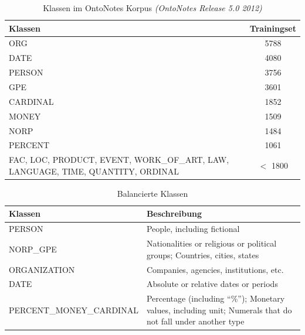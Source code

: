 \documentclass[bibliography=totoc]{scrartcl}
\begin{document}
\begin{appendices}
				\begin{table}[H]
					\centering
					\caption{Klassen im OntoNotes Korpus \textit{(OntoNotes Release 5.0 2012)}}
					\begin{tabularx}{\textwidth}{Xc}
						\toprule
						Klassen  & Trainingset \\
						\midrule
						ORG  & 5788 \\
						DATE & 4080  \\
						PERSON & 3756 \\
						GPE & 3601 \\
						CARDINAL & 1852 \\
						MONEY & 1509  \\
						NORP & 1484 \\
						PERCENT & 1061  \\
						FAC, LOC, PRODUCT, EVENT, WORK\_OF\_ART, LAW, LANGUAGE, TIME, QUANTITY, ORDINAL & $<$ 1800 \\
						\bottomrule
					\end{tabularx}
					
					\label{tab:classesunbalanced}
				\end{table}	
				
		\begin{table}[H]
			\centering
			\caption{Balancierte Klassen}
			
			\begin{tabularx}{\textwidth}{lX}
				\toprule
				Klassen  & Beschreibung \\
				\midrule
				PERSON 	& People, including fictional \\
				NORP\_GPE &	Nationalities or religious or political groups;
				Countries, cities, states\\
				ORGANIZATION &	Companies, agencies, institutions, etc.\\
				DATE &	Absolute or relative dates or periods\\
				PERCENT\_MONEY\_CARDINAL &	Percentage (including “\%”);
				Monetary values, including unit;
				Numerals that do not fall under another type \\
				\bottomrule
			\end{tabularx}
			\label{tab:descclasses}
		\end{table}
		

\end{appendices}
\end{document}
